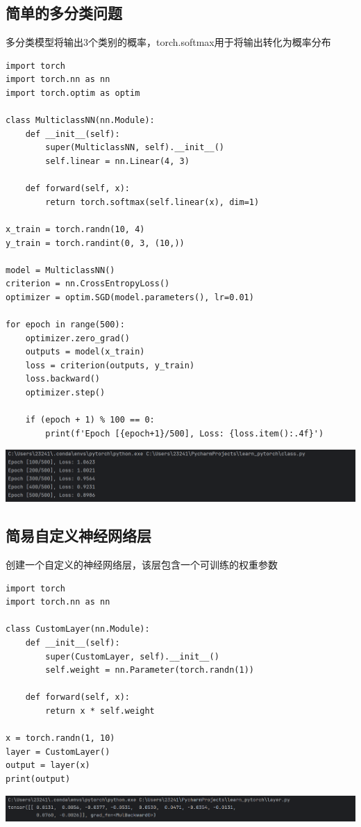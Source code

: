 \documentclass[UTF8,a4paper]{ctexart}
\begin{document}
\begin{sloppypar}
	\subsection{简单的多分类问题}
	多分类模型将输出3个类别的概率，torch.softmax用于将输出转化为概率分布
	\begin{lstlisting}
import torch
import torch.nn as nn
import torch.optim as optim

class MulticlassNN(nn.Module):
    def __init__(self):
        super(MulticlassNN, self).__init__()
        self.linear = nn.Linear(4, 3)

    def forward(self, x):
        return torch.softmax(self.linear(x), dim=1)

x_train = torch.randn(10, 4)
y_train = torch.randint(0, 3, (10,))

model = MulticlassNN()
criterion = nn.CrossEntropyLoss()
optimizer = optim.SGD(model.parameters(), lr=0.01)

for epoch in range(500):
    optimizer.zero_grad()
    outputs = model(x_train)
    loss = criterion(outputs, y_train)
    loss.backward()
    optimizer.step()

    if (epoch + 1) % 100 == 0:
        print(f'Epoch [{epoch+1}/500], Loss: {loss.item():.4f}')
    \end{lstlisting}
	
	\includegraphics[width = 16cm]{18}
	
	\subsection{简易自定义神经网络层}
	创建一个自定义的神经网络层，该层包含一个可训练的权重参数
	\begin{lstlisting}
import torch
import torch.nn as nn

class CustomLayer(nn.Module):
    def __init__(self):
        super(CustomLayer, self).__init__()
        self.weight = nn.Parameter(torch.randn(1))

    def forward(self, x):
        return x * self.weight

x = torch.randn(1, 10)
layer = CustomLayer()
output = layer(x)
print(output)
    \end{lstlisting}
	
	\includegraphics[width = 16cm]{19}
	

\end{sloppypar}
\end{document}
